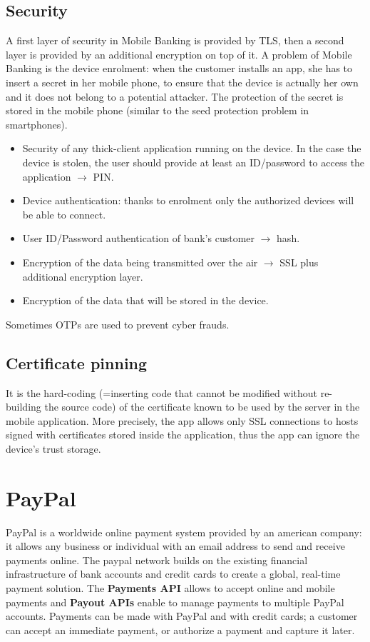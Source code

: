 \documentclass[a4paper, 10pt, titlepage]{article}
\begin{document}
\subsection{Security}
A first layer of security in Mobile Banking is provided by TLS, then a second layer is provided by an additional encryption on top of it. A problem of Mobile Banking is the device enrolment: when the customer installs an app, she has to insert a secret in her mobile phone, to ensure that the device is actually her own and it does not belong to a potential attacker. The protection of the secret is stored in the mobile phone (similar to the seed protection problem in smartphones).
\begin{itemize}
\item Security of any thick-client application running on the device. In the case the device is stolen, the user should provide at least an ID/password to access the application $\rightarrow$ PIN.
\item Device authentication: thanks to enrolment only the authorized devices will be able to connect.
\item User ID/Password authentication of bank's customer $\rightarrow$ hash.
\item Encryption of the data being transmitted over the air $\rightarrow$ SSL plus additional encryption layer.
\item Encryption of the data that will be stored in the device.
\end{itemize}
Sometimes OTPs are used to prevent cyber frauds.

\subsection{Certificate pinning}
It is the hard-coding (=inserting code that cannot be modified without re-building the source code) of the certificate known to be used by the server in the mobile application. More precisely, the app allows only SSL connections to hosts signed with certificates stored inside the application, thus the app can ignore the device's trust storage.

\section{PayPal}
PayPal is a worldwide online payment system provided by an american company: it allows any business or individual with an email address to send and receive payments online. The paypal network builds on the existing financial infrastructure of bank accounts and credit cards to create a global, real-time payment solution. The \textbf{Payments API} allows to accept online and mobile payments and \textbf{Payout APIs} enable to manage payments to multiple PayPal accounts. Payments can be made with PayPal and with credit cards; a customer can accept an immediate payment, or authorize a payment and capture it later.
\end{document}
